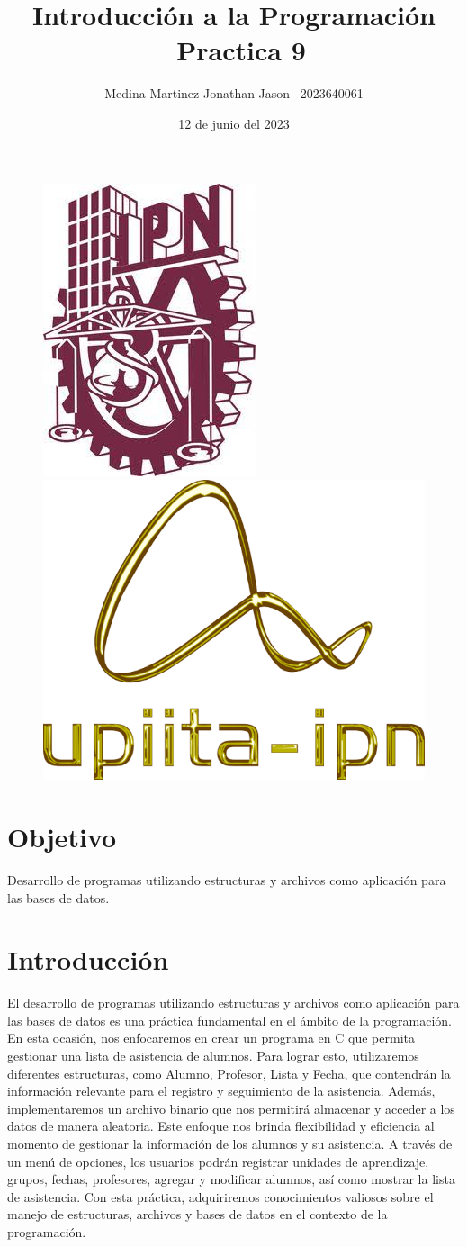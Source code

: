 \documentclass{article}
\title{Introducción a la Programación \ Practica 9}
\author{Medina Martinez Jonathan Jason \ 2023640061}
\date{12 de junio del 2023}
\begin{document}
	
	\fontsize{12}{16}\selectfont
	
	\begin{figure}[t] %
		
		\includegraphics[width=2.5 cm]{Logo1.jpeg}
		\hfill
		\includegraphics[width=3 cm]{Logo2.png}
		
	\end{figure}
	
	\maketitle %
	\newpage
	
	\tableofcontents %
	\newpage
	
	\section{Objetivo}
	
	Desarrollo de programas utilizando estructuras y archivos como aplicación para las bases de datos.
	
	\section{Introducción}
	
	El desarrollo de programas utilizando estructuras y archivos como aplicación para las bases de datos es una práctica fundamental en el ámbito de la programación. En esta ocasión, nos enfocaremos en crear un programa en C que permita gestionar una lista de asistencia de alumnos. Para lograr esto, utilizaremos diferentes estructuras, como Alumno, Profesor, Lista y Fecha, que contendrán la información relevante para el registro y seguimiento de la asistencia. Además, implementaremos un archivo binario que nos permitirá almacenar y acceder a los datos de manera aleatoria. Este enfoque nos brinda flexibilidad y eficiencia al momento de gestionar la información de los alumnos y su asistencia. A través de un menú de opciones, los usuarios podrán registrar unidades de aprendizaje, grupos, fechas, profesores, agregar y modificar alumnos, así como mostrar la lista de asistencia. Con esta práctica, adquiriremos conocimientos valiosos sobre el manejo de estructuras, archivos y bases de datos en el contexto de la programación.
	
\end{document}
